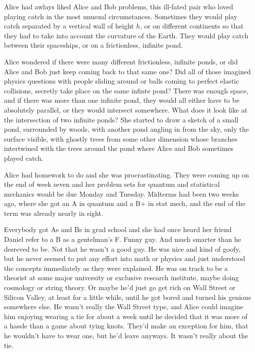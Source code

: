 \mypause

Alice had awlays liked Alice and Bob problems, this ill-fated pair who loved playing catch in the most unusual circumstances. Sometimes they would play catch separated by a vertical wall of height $h$, or on different continents so that they had to take into account the curvature of the Earth. They would play catch between their spaceships, or on a frictionless, infinite pond.

Alice wondered if there were many different frictionless, infinite ponds, or did Alice and Bob just keep coming back to that same one? Did all of those imagined physics questions with people sliding around or balls coming to perfect elastic collisions, secretly take place on the same infinte pond? There was enough space, and if there was more than one infinite pond, they would all either have to be absolutely parallel, or they would intersect somewhere. What does it look like at the intersection of two infinite ponds? She started to draw a sketch of a small pond, surrounded by woods, with another pond angling in from the sky, only the surface visible, with ghostly trees from some other dimension whose branches intertwined with the trees around the pond where Alice and Bob sometimes played catch. 

\mypause

Alice had homework to do and she was procrastinating. They were coming up on the end of week seven and her problem sets for quantum and statistical mechanics would be due Monday and Tuesday. Midterms had been two weeks ago, where she got an A in quantum and a B+ in stat mech, and the end of the term was already nearly in sight. 

Everybody got As and Bs in grad school and she had once heard her friend Daniel refer to a B as a gentelman's F. Funny guy. And much smarter than he desreved to be. Not that he wasn't a good guy. He was nice and kind of goofy, but he never seemed to put any effort into math or physics and just understood the concepts immediately as they were explained. He was on track to be a theorist at some major university or exclusive research institute, maybe doing cosmology or string theory. Or maybe he'd just go get rich on Wall Street or Silicon Valley, at least for a little while, until he got bored and turned his genious somewhere else. He wasn't really the Wall Street type, and Alice could imagine him enjoying wearing a tie for about a week until he decided that it was more of a hassle than a game about tying knots. They'd make an exception for him, that he wouldn't have to wear one, but he'd leave anyways. It wasn't really about the tie.

